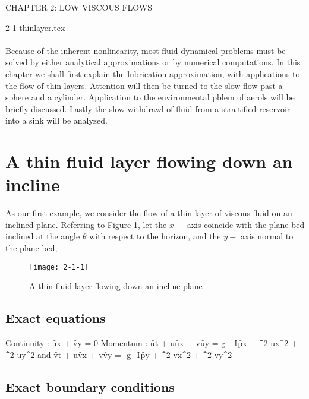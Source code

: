 

  \setcounter{chapter}{2}
\begin{center}{\large CHAPTER 2: LOW VISCOUS FLOWS} \end{center}
 2-1-thinlayer.tex\\
\\
Because of the inherent nonlinearity, most fluid-dynamical  problems must be solved by either  analytical approximations  or by  numerical computations.  
In this chapter  we shall first explain the lubrication approximation, with applications to the flow of thin layers. Attention will then be turned to the slow flow past a sphere and a cylinder. Application to the environmental pblem of aerols will be briefly discussed. Lastly the slow withdrawl of fluid from a straitified reservoir into a sink will be analyzed. 


  \section{A thin fluid layer  flowing down an incline} 
\setcounter{equation}{0}
As our first example, we consider  the flow   of a thin layer of   viscous fluid on an inclined plane.  
Referring to Figure \ref{fig:inclin-sht}, let the $x-$ axis coincide with the  plane  bed inclined at the angle $\theta$ with respect to the horizon, and the $y-$ axis normal to the plane bed, 
\begin{figure}[h]
	\begin{center}
		\texttt{[image: 2-1-1]}
	\end{center}
	\caption{A thin  fluid layer flowing down an incline plane}
	\label{fig:inclin-sht}
\end{figure}

 

\subsection{Exact equations} 

Continuity :
\be \f{\p u}{\p x} + \f{\p v}{\p y} = 0 \ee
Momentum :
\be \f{\p u}{\p t} + u\f{\p u}{\p x} + v\f{\p u}{\p y} =   g \sin \theta - 
\f{1}{\rho}\f{\p p}{\p x} + \nu \lp \f{\p^2  u}{\p x^2} + \f{\p^2 u}{\p y^2 } \rp \ee
and
\be \f{\p v}{\p t} + u\f{\p v}{\p x} + v\f{\p v}{\p y} = -g \cos \theta -\f{1}{\rho}\f{\p p}{\p y} + \nu \lp \f{\p^2  v}{\p x^2} + \f{\p^2 v}{\p y^2 } \rp \ee


\subsection{Exact boundary conditions}

